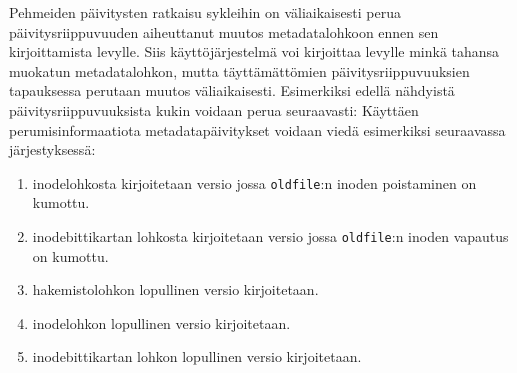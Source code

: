 Pehmeiden päivitysten ratkaisu sykleihin on väliaikaisesti perua päivitysriippuvuuden aiheuttanut muutos metadatalohkoon ennen sen kirjoittamista levylle.
Siis käyttöjärjestelmä voi kirjoittaa levylle minkä tahansa muokatun metadatalohkon,
mutta täyttämättömien päivitysriippuvuuksien tapauksessa perutaan muutos väliaikaisesti.
Esimerkiksi edellä nähdyistä päivitysriippuvuuksista kukin voidaan perua seuraavasti:
Käyttäen perumisinformaatiota metadatapäivitykset voidaan viedä esimerkiksi seuraavassa järjestyksessä:
\begin{enumerate}
    \item{inodelohkosta kirjoitetaan versio jossa \texttt{oldfile}:n inoden poistaminen on kumottu.}
    \item{inodebittikartan lohkosta kirjoitetaan versio jossa \texttt{oldfile}:n inoden vapautus on kumottu.}
    \item{hakemistolohkon lopullinen versio kirjoitetaan.}
    \item{inodelohkon lopullinen versio kirjoitetaan.}
    \item{inodebittikartan lohkon lopullinen versio kirjoitetaan.}
\end{enumerate}




